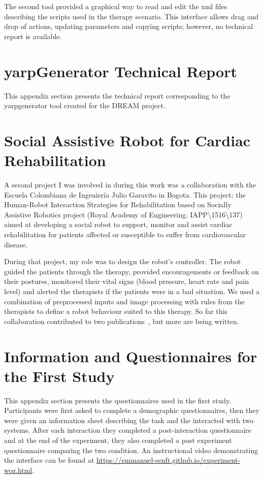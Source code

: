 The second tool provided a graphical way to read and edit the xml files describing the scripts used in the therapy scenario. This interface allows drag and drop of actions, updating parameters and copying scripts; however, no technical report is available.

\cleartooddpage
\chapter{yarpGenerator Technical Report} \label{app:yarpgenerator}
This appendix section presents the technical report corresponding to the yarpgenerator tool created for the DREAM project.

\cleartooddpage
\chapter{Social Assistive Robot for Cardiac Rehabilitation} \label{app:Colombia}

A  second project I was involved in during this work was a collaboration with the Escuela Colombiana de Ingeniería Julio Garavito in Bogota. This project:  the Human-Robot Interaction Strategies for Rehabilitation based on Socially Assistive Robotics project (Royal Academy of Engineering: IAPP\textbackslash1516\textbackslash137) aimed at developing a social robot to support, monitor and assist cardiac rehabilitation for patients affected or susceptible to suffer from cardiovascular disease.

During that project, my role was to design the robot's controller. The robot guided the patients through the therapy, provided encouragements or feedback on their postures, monitored their vital signs (blood pressure, heart rate and pain level) and alerted the therapists if the patients were in a bad situation. We used a combination of preprocessed inputs and image processing with rules from the therapists to define a robot behaviour suited to this therapy. So far this collaboration contributed to two publications~\citep{lara2017human,casas2018social}, but more are being written.

\cleartooddpage
\chapter{Information and Questionnaires for the First Study} \label{app:woz_questionnaires}
This appendix section presents the questionnaires used in the first study. Participants were first asked to complete a demographic questionnaires, then they were given an information sheet describing the task and the interacted with two systems. After each interaction they completed a post-interaction questionnaire and at the end of the experiment, they also completed a post experiment questionnaire comparing the two condition. An instructional video demonstrating the interface can be found at  \url{https://emmanuel-senft.github.io/experiment-woz.html}.

